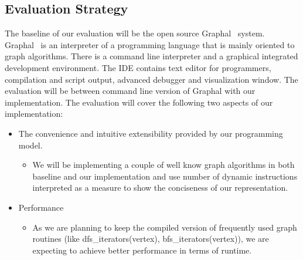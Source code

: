 \documentclass[12,twoside]{article}
\begin{document}
\subsection{Evaluation Strategy}
The baseline of our evaluation will be the open source Graphal~\cite{Graphal} system.  
Graphal~\cite{Graphal} is an interpreter of a programming language that is mainly 
oriented to graph algorithms. There is a command line interpreter and a 
graphical integrated development environment. The IDE contains text editor for 
programmers, compilation and script output, advanced debugger and visualization 
window. The evaluation will be between command line version of Graphal with our
implementation.
  The evaluation will
  cover the following two aspects of our implementation:
  \begin{itemize}
    \item The convenience and intuitive extensibility provided by our 
    programming model.
    \begin{itemize}
      \item We will be implementing a couple of well know graph algorithms in 
      both baseline and our implementation
        and use number of dynamic instructions interpreted as a measure to show 
        the conciseness of our
        representation.
    \end{itemize}
    \item Performance
    \begin{itemize}
      \item As we are planning to keep the compiled version of frequently used 
      graph routines (like dfs\_iterators(vertex), bfs\_iterators(vertex)), we are 
      expecting to achieve better performance in terms of runtime.  
      \end{itemize}
  \end{itemize}







\end{document}
